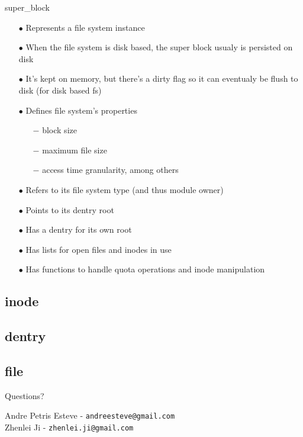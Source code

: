 \documentclass{beamer}
\begin{document}
\begin{frame}{super\_block}
	
	\begin{itemize}[<+->]

		\item[$\bullet$]{Represents a file system instance}
		\item[$\bullet$]{When the file system is disk based, the super block usualy is persisted on disk}		
		\item[$\bullet$]{It's kept on memory, but there's a dirty flag so it can eventualy be flush to disk (for disk based fs)}
		\item[$\bullet$]{Defines file system's properties}
			\begin{itemize}
				\item[$-$]{block size}
				\item[$-$]{maximum file size}
				\item[$-$]{access time granularity, among others}
			\end{itemize}	
		
		\item[$\bullet$]{Refers to its file system type (and thus module owner)}
		\item[$\bullet$]{Points to its dentry root}
		\item[$\bullet$]{Has a dentry for its own root}
		\item[$\bullet$]{Has lists for open files and inodes in use}
		\item[$\bullet$]{Has functions to handle quota operations and inode manipulation}
		
	\end{itemize}

\end{frame}

\subsection{inode}

\subsection{dentry}

\subsection{file}



\begin{frame}[plain]

  \begin{center}
    \Huge Questions?
  \end{center}

  \vspace{0.2in}

  \begin{center}
	Andre Petris Esteve - \texttt{andreesteve@gmail.com}\\
	Zhenlei Ji - \texttt{zhenlei.ji@gmail.com}
  \end{center}
\end{frame}
\end{document}
